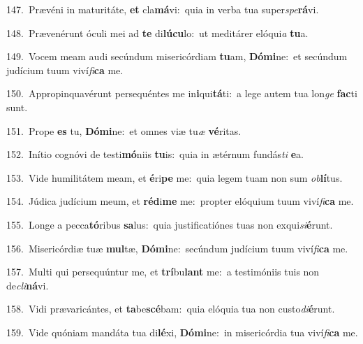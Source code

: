 {\numbfont\textcolor{\numbcolor}{147.}}~Prævéni in maturitáte, \textbf{et} cla\-\textbf{má}\-vi:~\star quia in verba tua super\-\textit{spe}\-\textbf{rá}vi.\par
{\numbfont\textcolor{\numbcolor}{148.}}~Prævenérunt óculi mei ad \textbf{te} di\-\textbf{lú}\-\textbf{cu}lo:~\star ut meditárer elóqui\textit{a} \textbf{tu}\-a.\par
{\numbfont\textcolor{\numbcolor}{149.}}~Vocem meam audi secúndum misericórdiam \textbf{tu}\-am, \textbf{Dó}\-\textbf{mi}ne:~\star et secúndum judícium tuum viví\-\textit{fi}\-\textbf{ca} me.\par
{\numbfont\textcolor{\numbcolor}{150.}}~Appropinquavérunt persequéntes me in\-\textbf{i}\-qui\-\textbf{tá}\-ti:~\star a lege autem tua lon\textit{ge} \textbf{fac}\-ti sunt.\par
{\numbfont\textcolor{\numbcolor}{151.}}~Prope \textbf{es} tu, \textbf{Dó}\-\textbf{mi}ne:~\star et omnes viæ tu\textit{æ} \textbf{vé}\-ritas.\par
{\numbfont\textcolor{\numbcolor}{152.}}~Inítio cognóvi de testi\-\textbf{mó}\-niis \textbf{tu}\-is:~\star quia in ætérnum fundás\textit{ti} \textbf{e}\-a.\par
{\numbfont\textcolor{\numbcolor}{153.}}~Vide humilitátem meam, et \textbf{é}\-ri\textbf{pe} me:~\star quia legem tuam non sum \textit{ob}\-\textbf{lí}tus.\par
{\numbfont\textcolor{\numbcolor}{154.}}~Júdica judícium meum, et \textbf{réd}\-i\textbf{me} me:~\star propter elóquium tuum viví\-\textit{fi}\-\textbf{ca} me.\par
{\numbfont\textcolor{\numbcolor}{155.}}~Longe a pecca\-\textbf{tó}\-ribus \textbf{sa}\-lus:~\star quia justificatiónes tuas non exqui\-\textit{si}\-\textbf{é}runt.\par
{\numbfont\textcolor{\numbcolor}{156.}}~Misericórdiæ tuæ \textbf{mul}\-tæ, \textbf{Dó}\-\textbf{mi}ne:~\star secúndum judícium tuum viví\-\textit{fi}\-\textbf{ca} me.\par
{\numbfont\textcolor{\numbcolor}{157.}}~Multi qui persequúntur me, et \textbf{trí}\-bu\textbf{lant} me:~\star a testimóniis tuis non de\-\textit{cli}\-\textbf{ná}vi.\par
{\numbfont\textcolor{\numbcolor}{158.}}~Vidi prævaricántes, et \textbf{ta}\-be\-\textbf{scé}\-bam:~\star quia elóquia tua non custo\-\textit{di}\-\textbf{é}runt.\par
{\numbfont\textcolor{\numbcolor}{159.}}~Vide quóniam mandáta tua di\-\textbf{lé}\-xi, \textbf{Dó}\-\textbf{mi}ne:~\star in misericórdia tua viví\-\textit{fi}\-\textbf{ca} me.\par
